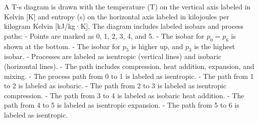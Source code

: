 A T-s diagram is drawn with the temperature (T) on the vertical axis labeled in Kelvin [K] and entropy (s) on the horizontal axis labeled in kilojoules per kilogram Kelvin [kJ/kg·K]. The diagram includes labeled isobars and process paths:  
- Points are marked as 0, 1, 2, 3, 4, and 5.  
- The isobar for \( p_0 = p_6 \) is shown at the bottom.  
- The isobar for \( p_5 \) is higher up, and \( p_3 \) is the highest isobar.  
- Processes are labeled as isentropic (vertical lines) and isobaric (horizontal lines).  
- The path includes compression, heat addition, expansion, and mixing.  
- The process path from 0 to 1 is labeled as isentropic.  
- The path from 1 to 2 is labeled as isobaric.  
- The path from 2 to 3 is labeled as isentropic compression.  
- The path from 3 to 4 is labeled as isobaric heat addition.  
- The path from 4 to 5 is labeled as isentropic expansion.  
- The path from 5 to 6 is labeled as isentropic.